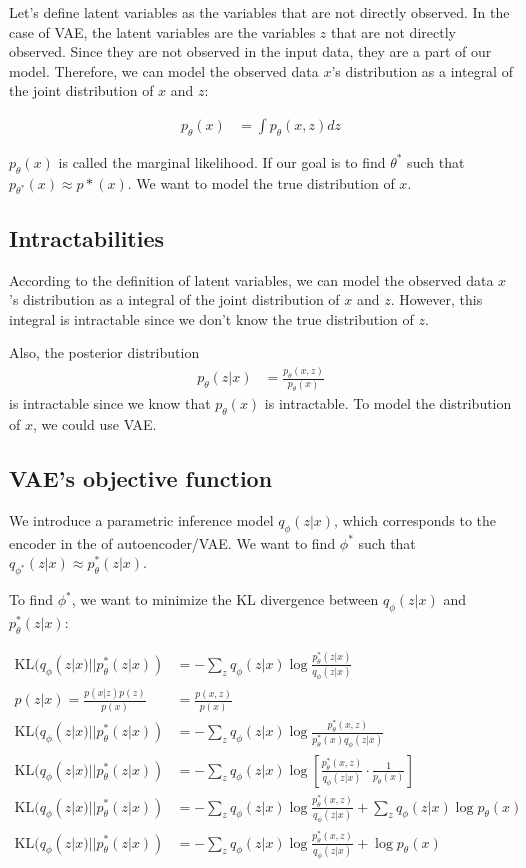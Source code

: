 \documentclass[11pt]{article}
\theoremstyle{definition}
\begin{document}
Let's define latent variables as the variables that are not directly observed. In the case of VAE, the latent variables are the variables $z$ that are not directly observed. Since they are not observed in the input data, they are a part of our model. Therefore, we can model the observed data $x$'s distribution as a integral of the joint distribution of $x$ and $z$:

\begin{align}
    p_\theta(x) &= \int p_\theta(x, z) dz
\end{align}

$p_\theta(x)$ is called the marginal likelihood. If our goal is to find $\theta^*$ such that $p_{\theta^*}(x) \approx p*(x)$. We want to model the true distribution of $x$. 

\subsection{Intractabilities}

According to the definition of latent variables, we can model the observed data $x$'s distribution as a integral of the joint distribution of $x$ and $z$. However, this integral is intractable since we don't know the true distribution of $z$. 

Also, the posterior distribution 
\begin{align}
    p_\theta(z|x) &= \frac{p_\theta(x, z)}{p_\theta(x)}
\end{align}
is intractable since we know that $p_\theta(x)$ is intractable. To model the distribution of $x$, we could use VAE.


\subsection{VAE's objective function}

We introduce a parametric inference model $q_\phi(z|x)$, which corresponds to the encoder in the of autoencoder/VAE. We want to find $\phi^*$ such that $q_{\phi^*}(z|x) \approx p_\theta^*(z|x)$.

To find $\phi^*$, we want to minimize the KL divergence between $q_\phi(z|x)$ and $p_\theta^*(z|x)$:

\begin{align}
    \text{KL}(q_\phi(z|x)||p_\theta^*(z|x)) &= -\sum_{z} q_\phi(z|x) \log \frac{p_\theta^*(z|x)}{q_\phi(z|x)} \\
    p(z|x) = \frac{p(x|z) p(z)}{p(x)} &= \frac{p(x, z)}{p(x)}\\
    \text{KL}(q_\phi(z|x)||p_\theta^*(z|x)) &= -\sum_{z} q_\phi(z|x) \log \frac{p_\theta^*(x, z)}{p_\theta^*(x)q_\phi(z|x)} \\
    \text{KL}(q_\phi(z|x)||p_\theta^*(z|x)) &= -\sum_{z} q_\phi(z|x) \log \left[ \frac{p_\theta^*(x, z)}{q_\phi(z|x)}\cdot\frac{1}{p_\theta(x)}\right] \\
    \text{KL}(q_\phi(z|x)||p_\theta^*(z|x)) &= -\sum_{z} q_\phi(z|x) \log \frac{p_\theta^*(x, z)}{q_\phi(z|x)} + \sum_{z} q_\phi(z|x) \log p_\theta(x) \\
    \text{KL}(q_\phi(z|x)||p_\theta^*(z|x)) &= -\sum_{z} q_\phi(z|x) \log \frac{p_\theta^*(x, z)}{q_\phi(z|x)} + \log p_\theta(x)
\end{align}
\end{document}
